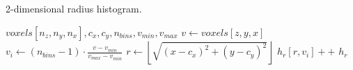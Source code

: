 
\begin{algorithm}
    \caption{2-dimensional radius histogram.}
    \label{alg:2dhists}
    \begin{algorithmic}
         {$voxels[n_z,n_y,n_x],c_x,c_y,n_{bins},v_{min},v_{max}$}
                \State $v \gets voxels[z,y,x]$
                    \State $v_{i} \gets (n_{bins}-1) \cdot \frac{v - v_{min}}{v_{max} - v_{min}}$
                    \State $r \gets \left\lfloor\sqrt{(x-c_x)^2 + (y-c_y)^2}\right\rfloor$
                    \State $h_r[r,v_{i}]{+}{+}$
                \EndIf
            \EndFor
            \Return $h_r$
        \EndFunction
    \end{algorithmic}
\end{algorithm}

